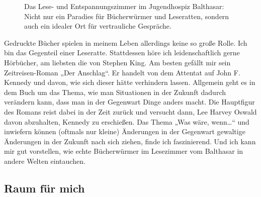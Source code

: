 \documentclass[fontsize=14pt,a4paper,headinclude,DIV=calc,automark]{scrbook}
\begin{document}
\setlength{\fboxsep}{0pt}    %
\setlength{\fboxrule}{0.2pt} %
\begin{figure}[ht]
    \raggedright
    \caption{Das Lese- und Entspannungszimmer im Jugendhospiz Balthasar: Nicht nur ein Paradies für Bücherwürmer und Leseratten, sondern auch ein idealer Ort für vertrauliche Gespräche.}
    \label{fig:lese_und_entspannungszimmer}
\end{figure}

Gedruckte Bücher spielen in meinem Leben allerdings keine so große Rolle. Ich bin das Gegenteil einer Leseratte. Stattdessen höre ich leidenschaftlich gerne Hörbücher, am liebsten die von Stephen King. Am besten gefällt mir sein Zeitreisen-Roman „Der Anschlag“. Er handelt von dem Attentat auf John F. Kennedy und davon, wie sich dieser hätte verhindern lassen. Allgemein geht es in dem Buch um das Thema, wie man Situationen in der Zukunft dadurch verändern kann, dass man in der Gegenwart Dinge anders macht. Die Hauptfigur des Romans reist dabei in der Zeit zurück und versucht dann, Lee Harvey Oswald davon abzuhalten, Kennedy zu erschießen. Das Thema „Was wäre, wenn…“ und inwiefern können (oftmals nur kleine) Änderungen in der Gegenwart gewaltige Änderungen in der Zukunft nach sich ziehen, finde ich faszinierend. Und ich kann mir gut vorstellen, wie echte Bücherwürmer im Lesezimmer vom Balthasar in andere Welten eintauchen.

\subsection{Raum für mich}
\end{document}
